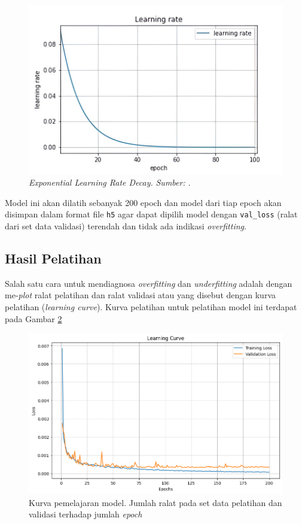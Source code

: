 \begin{figure}[h!]
    \centering
    \includegraphics[width=12cm]{gambar/exp.png}
    \caption{\textit{Exponential Learning Rate Decay.} \textit{Sumber: \citep{suki_lau_2017}}.}
    \label{exp_lr}
\end{figure}

Model ini akan dilatih sebanyak 200 epoch dan model dari tiap epoch akan disimpan dalam format file \texttt{h5} agar dapat dipilih model dengan \texttt{val\_loss} (ralat dari set data validasi) terendah dan tidak ada indikasi \textit{overfitting}.

\subsection{Hasil Pelatihan}
Salah satu cara untuk mendiagnosa \textit{overfitting} dan \textit{underfitting} adalah dengan me-\textit{plot} ralat pelatihan dan ralat validasi \citep{elgendy_2020} atau yang disebut dengan kurva pelatihan (\textit{learning curve}). Kurva pelatihan untuk pelatihan model ini terdapat pada Gambar \ref{learning_curve}

\begin{figure}[h!]
    \centering
    \includegraphics[width=12cm]{gambar/learning_curve.png}
    \caption{Kurva pemelajaran model. Jumlah ralat pada set data pelatihan dan validasi terhadap jumlah \textit{epoch}}
    \label{learning_curve}
\end{figure}

